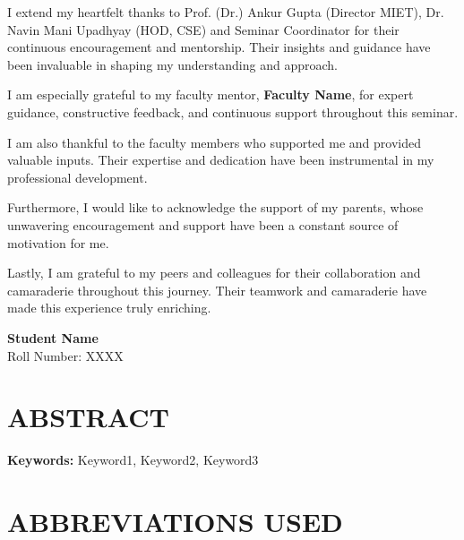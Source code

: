 \documentclass[12pt,a4paper]{report}
\begin{document}
I extend my heartfelt thanks to Prof. (Dr.) Ankur Gupta (Director MIET), Dr. Navin Mani Upadhyay (HOD, CSE) and Seminar Coordinator for their continuous encouragement and mentorship. Their insights and guidance have been invaluable in shaping my understanding and approach.

I am especially grateful to my faculty mentor, \textbf{Faculty Name}, for expert guidance, constructive feedback, and continuous support throughout this seminar.

I am also thankful to the faculty members who supported me and provided valuable inputs. Their expertise and dedication have been instrumental in my professional development.

Furthermore, I would like to acknowledge the support of my parents, whose unwavering encouragement and support have been a constant source of motivation for me.

Lastly, I am grateful to my peers and colleagues for their collaboration and camaraderie throughout this journey. Their teamwork and camaraderie have made this experience truly enriching.

\vspace{2cm}

\begin{flushright}
\textbf{Student Name}\\
Roll Number: XXXX
\end{flushright}

\newpage

\chapter*{ABSTRACT}


\textbf{Keywords:} Keyword1, Keyword2, Keyword3

\newpage

\tableofcontents

\newpage

\listoftables
{}

\newpage

\listoffigures
{}

\newpage

\chapter*{ABBREVIATIONS USED}
\end{document}

